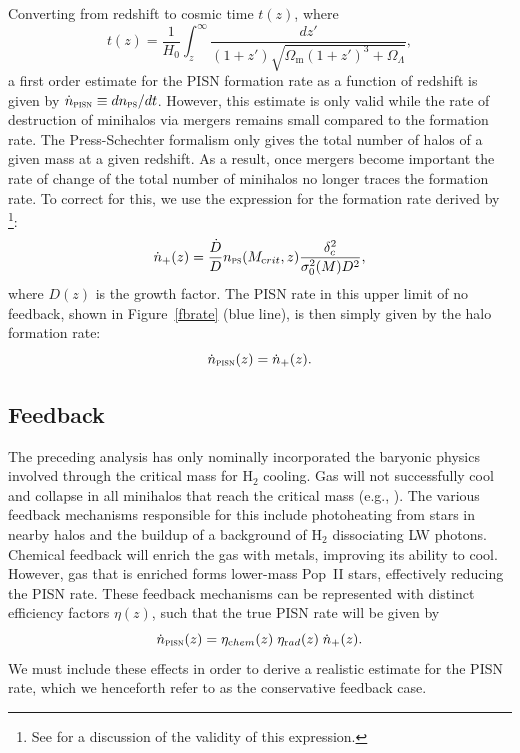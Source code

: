 \documentclass{thesis}
\newcommand{\RefFig}[1]{\mbox{Figure~\ref{#1}}}
\begin{document}
Converting from redshift to cosmic time $t(z)$, where
\begin{equation} 
t(z) = \frac{1}{H_0}
\int_z^{\infty}\frac{dz'}{(1+z')\sqrt{\Omega_{\mathrm m} (1+z')^3 + \Omega_{\Lambda}}} ,
\end{equation} 
a first order estimate for the PISN formation rate as a function
of redshift is given by $\dot{n}_{\textsc{pisn}}\equiv
dn_{\textsc{ps}}/dt$. However, this estimate is only valid while the
rate of destruction of minihalos via mergers remains small compared to
the formation rate. The Press-Schechter formalism only gives the total
number of halos of a given mass at a given redshift. As a result, once
mergers become important the rate of change of the total number of
minihalos no longer traces the formation rate. To correct for this, we
use the expression for the formation rate derived by
\citet{Sasaki1994}\footnote{See \citet{Mitraetal2011}
  for a discussion of the validity of this expression.}:
\begin{equation}
\dot{n}_{+}(z) = \frac{\dot{D}}{D} n_{\textsc{ps}}(M_{\mathrm crit},z)
\frac{\delta_c^2}{\sigma^2_0(M) D^2},
\end{equation}
where $D(z)$ is the growth factor.  The PISN rate
in this upper limit of no feedback, shown in \RefFig{fbrate} (blue
line), is then simply given by the halo formation rate:
\begin{equation}
\dot{n}_{\textsc{pisn}}(z) = \dot{n}_{+}(z).
\end{equation}

\subsection{Feedback}
The preceding analysis has only nominally incorporated the baryonic
physics involved through the critical mass for H$_2$ cooling. Gas will
not successfully cool and collapse in all minihalos that reach the
critical mass (e.g., \citealt{Yoshidaetal2003}). The various feedback
mechanisms responsible for this include photoheating from stars in
nearby halos and the buildup of a background of H$_2$ dissociating LW
photons. Chemical feedback will enrich the gas with metals, improving
its ability to cool.  However, gas that is enriched forms lower-mass
Pop~II stars, effectively reducing the PISN rate. These
feedback mechanisms can be represented with distinct efficiency
factors $\eta(z)$, such that the true PISN rate will be given by
\begin{equation}
  \dot{n}_{\textsc{pisn}}(z) = 
  \eta_{\mathrm chem}(z) \; \eta_{\mathrm rad}(z) \; \dot{n}_{+}(z).
  \label{pisnrate1}
\end{equation}
We must include these effects in order to derive a realistic estimate
for the PISN rate, which we henceforth refer to as the conservative
feedback case.
\end{document}
